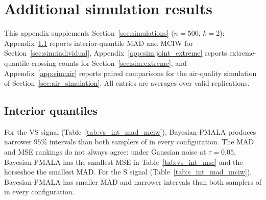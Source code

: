 \section{Additional simulation results}
\label{app:simulation_results}

This appendix supplements Section~\ref{sec:simulations} ($n=500$, $k=2$): Appendix~\ref{app:sim:individual} reports interior-quantile MAD and MCIW for Section~\ref{sec:sim:individual}, Appendix~\ref{app:sim:joint_extreme} reports extreme-quantile crossing counts for Section~\ref{sec:sim:extreme}, and Appendix~\ref{app:sim:air} reports paired comparisons for the air-quality simulation of Section~\ref{sec:air_simulation}. All entries are averages over valid replications.

\subsection{Interior quantiles}
\label{app:sim:individual}
\label{app:sim:individual:vs}
\label{app:sim:individual:smooth}

For the VS signal (Table~\ref{tab:vs_int_mad_mciw}), Bayesian-PMALA produces narrower $95\%$ intervals than both samplers of \citet{onizuka2024fast} in every configuration. The MAD and MSE rankings do not always agree: under Gaussian noise at $\tau = 0.05$, Bayesian-PMALA has the smallest MSE in Table~\ref{tab:vs_int_mse} and the horseshoe the smallest MAD. For the S signal (Table~\ref{tab:s_int_mad_mciw}), Bayesian-PMALA has smaller MAD and narrower intervals than both samplers of \citet{onizuka2024fast} in every configuration.

